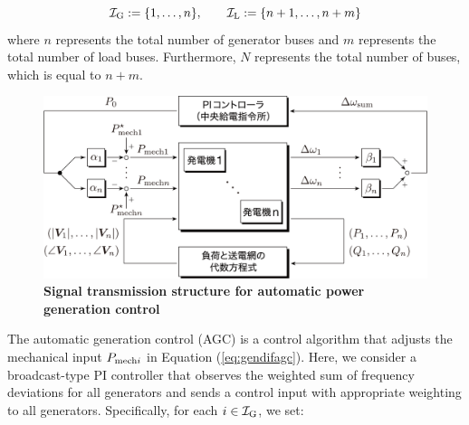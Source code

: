 \documentclass[graybox, envcountchap]{svmult}
\begin{document}
\[
  \mathcal{I}_{\rm G} :=  \{1,\ldots, n\}
  ,\qquad
  \mathcal{I}_{\rm L} := \{n+1,\ldots, n+m\}
\]
where $n$ represents the total number of generator buses and $m$ represents the
total number of load buses. Furthermore, $N$ represents the total number of
buses, which is equal to $n+m$.

\begin{figure}[t]
\centering
\includegraphics[width = .99\linewidth]{figs/bcAGC}
\medskip
\caption{\textbf{Signal transmission structure for automatic power generation control}}
\label{fig:bcAGC}
\medskip
\end{figure}

The automatic generation control (AGC) is a control algorithm that adjusts the
mechanical input $P_{{\rm mech}i}$ in Equation (\ref{eq:gendifagc}). Here, we
consider a broadcast-type PI controller that observes the weighted sum of
frequency deviations for all generators and sends a control input with
appropriate weighting to all generators. Specifically, for each $i \in
\mathcal{I}_{\rm G}$, we set:
\end{document}

